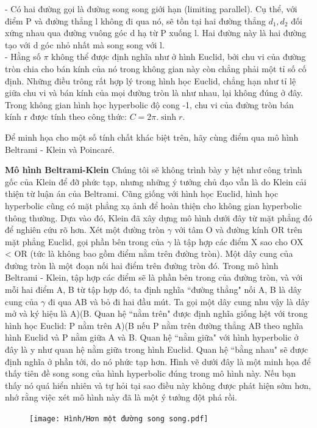 \begin{multicols}{2}
	- Có hai đường gọi là đường song song giới hạn (limiting parallel). Cụ thể, với điểm P và đường thẳng l không đi qua nó, sẽ tồn tại hai đường thẳng $d_1, d_2$ đối xứng nhau qua đường vuông góc d hạ từ P xuống l. Hai đường này là hai đường tạo với d góc nhỏ nhất mà song song với l. \\
	- Hằng số $\pi$  không thể được định nghĩa như ở hình Euclid, bởi chu vi của đường tròn chia cho bán kính của nó trong không gian này còn chẳng phải một tỉ số cố định. Những điều trông rất hợp lý trong hình học Euclid, chẳng hạn như tỉ lệ giữa chu vi và bán kính của mọi đường tròn là như nhau, lại không đúng ở đây. Trong không gian hình học hyperbolic độ cong -1, chu vi của đường tròn bán kính r được tính theo công thức: $C = 2\pi.\sinh r$. 
	
	
	Để minh họa cho một số tính chất khác biệt trên, hãy cùng điểm qua mô hình Beltrami - Klein và Poincaré.  
	
	\textbf{\color{lichsutoanhoc}Mô hình Beltrami-Klein}
	Chúng tôi sẽ không trình bày y hệt như công trình gốc của Klein để đỡ phức tạp, nhưng những ý tưởng chủ đạo vẫn là do Klein cải thiện từ luận án của Beltrami.
	Cũng giống với hình học Euclid, hình học hyperbolic cũng có mặt phẳng xạ ảnh để hoàn thiện cho không gian hyperbolic thông thường. Dựa vào đó, Klein đã xây dựng mô hình dưới đây từ mặt phẳng đó để nghiên cứu rõ hơn.
	Xét một đường tròn $\gamma$ với tâm O và đường kính OR trên mặt phẳng Euclid, gọi phần bên trong của $ \gamma$ là tập hợp các điểm X sao cho OX < OR (tức là không bao gồm điểm nằm trên đường tròn). Một dây cung của đường tròn là một đoạn nối hai điểm trên đường tròn đó.
	Trong mô hình Beltrami - Klein, tập hợp các điểm sẽ là phần bên trong của đường tròn, và với mỗi hai điểm A, B từ tập hợp đó, ta định nghĩa ``đường thẳng" nối A, B là dây cung của $ \gamma$ đi qua AB và bỏ đi hai đầu mút. Ta gọi một dây cung nhu vậy là dây mở và ký hiệu là A)(B. Quan hệ ``nằm trên" được định nghĩa giống hệt với trong hình học Euclid: P nằm trên A)(B nếu P nằm trên đường thẳng AB theo nghĩa hình Euclid và P nằm giữa A và B. Quan hệ ``nằm giữa" với hình hyperbolic ở đây là y như quan hệ nằm giữa trong hình Euclid. Quan hệ ``bằng nhau" sẽ được định nghĩa ở phần tới, do nó phức tạp hơn.
	Hình vẽ dưới đây là một minh họa để thấy tiên đề song song của hình hyperbolic đúng trong mô hình này. Nếu bạn thấy nó quá hiển nhiên và tự hỏi tại sao điều này không được phát hiện sớm hơn, nhớ rằng việc xét mô hình này đã là một ý tưởng đột phá rồi. 
	
	
	\begin{figure}[ht]
		\texttt{[image: Hình/Hơn một đường song song.pdf]}
	\end{figure}
	

\end{multicols}
